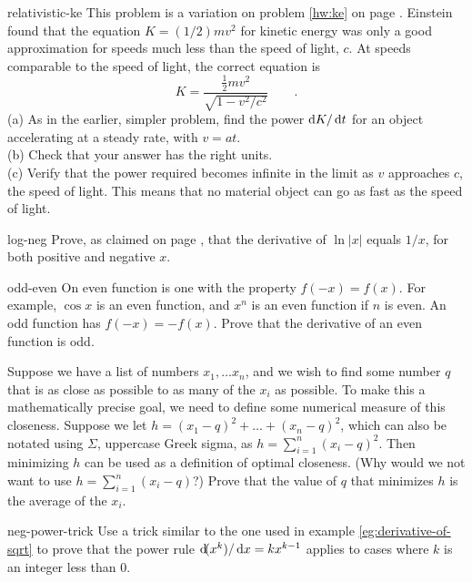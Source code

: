 \begin{hwsection}
\begin{hwwithsoln}{relativistic-ke}
This problem is a variation on problem \ref{hw:ke} on page \pageref{hw:ke}. Einstein found that the
equation $K=(1/2)mv^2$ for kinetic energy was only a good approximation for speeds much less than
the speed of light, $c$. At speeds comparable to the speed of light, the correct equation is
\begin{equation*}
  K = \frac{\frac{1}{2}mv^2}{\sqrt{1-v^2/c^2}} \qquad .
\end{equation*}
(a) As in the earlier, simpler problem, find the power $\operatorname{d\!} K/\operatorname{d\!} t$ for an object accelerating
at a steady rate, with $v=at$. \\
(b) Check that your answer has the right units.\\
(c) Verify that the power required becomes infinite in the limit as $v$ approaches $c$, the speed of
light. This means that no material object can go as fast as the speed of light.
\end{hwwithsoln}

\begin{hwwithsoln}{log-neg}
Prove, as claimed on page \pageref{log-neg},
that the derivative of $\ln |x|$ equals $1/x$, for both positive and negative $x$.
\end{hwwithsoln}

\begin{hwwithsoln}{odd-even}
On even function is one with the property $f(-x)=f(x)$. For example, $\cos x$ is an even function, and $x^n$ is an even function if
$n$ is even. An odd function has $f(-x)=-f(x)$. Prove that the derivative of an even function is odd.
\end{hwwithsoln}

\begin{hw}
Suppose we have a list of numbers $x_1,\ldots x_n$, and we wish to find some number $q$ that is as close as possible
to as many of the $x_i$ as possible. To make this a mathematically precise goal, we need to define some numerical
measure of this closeness. Suppose we let $h=(x_1-q)^2+\ldots+(x_n-q)^2$, which can also be notated using $\Sigma$, uppercase Greek
sigma, as $h=\sum_{i=1}^n (x_i-q)^2$. Then minimizing $h$ can be used as a definition of optimal closeness.
(Why would we not want to use $h=\sum_{i=1}^n (x_i-q)$?) Prove that the value of $q$ that minimizes $h$ is
the average of the $x_i$.
\end{hw}

\begin{hwwithsoln}[2]{neg-power-trick}
Use a trick similar to the one used in example \ref{eg:derivative-of-sqrt} to prove that the power
rule $\operatorname{d\!}(x^k)/\operatorname{d\!} x=kx^{k-1}$ applies to cases where $k$ is an integer less than 0.
\end{hwwithsoln}


\end{hwsection}
